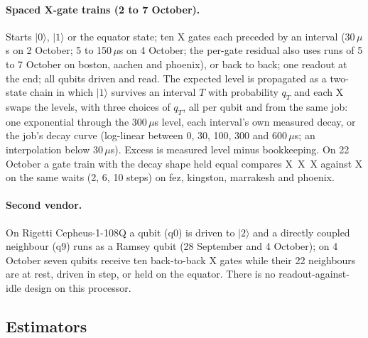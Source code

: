 \documentclass[reprint,amsmath,amssymb,aps,superscriptaddress,nofootinbib]{revtex4-2}
\newcommand{\us}{\,$\mu$s}
\begin{document}
\paragraph*{Spaced X-gate trains (2 to 7 October).} Starts $|0\rangle$, $|1\rangle$ or the equator state; ten X gates each preceded by an interval (30\us{} on 2 October; 5 to 150\us{} on 4 October; the per-gate residual also uses runs of 5 to 7 October on boston, aachen and phoenix), or back to back; one readout at the end; all qubits driven and read. The expected level is propagated as a two-state chain in which $|1\rangle$ survives an interval $T$ with probability $q_T$ and each X swaps the levels, with three choices of $q_T$, all per qubit and from the same job: one exponential through the 300\us{} level, each interval's own measured decay, or the job's decay curve (log-linear between 0, 30, 100, 300 and 600\us; an interpolation below 30\us). Excess is measured level minus bookkeeping. On 22 October a gate train with the decay shape held equal compares X~X~X against X on the same waits (2, 6, 10 steps) on fez, kingston, marrakesh and phoenix.

\paragraph*{Second vendor.} On Rigetti Cepheus-1-108Q a qubit (q0) is driven to $|2\rangle$ and a directly coupled neighbour (q9) runs as a Ramsey qubit (28 September and 4 October); on 4 October seven qubits receive ten back-to-back X gates while their 22 neighbours are at rest, driven in step, or held on the equator. There is no readout-against-idle design on this processor.

\subsection{Estimators}
\end{document}
